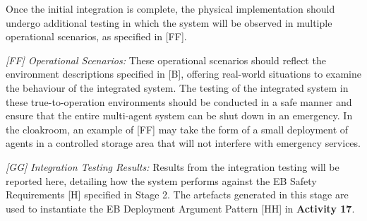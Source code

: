 \documentclass[runningheads]{llncs}
\begin{document}
Once the initial integration is complete, the physical implementation should undergo additional testing in which the system will be observed in multiple operational scenarios, as specified in [FF].

\emph{[FF] Operational Scenarios:} These operational scenarios should reflect the environment descriptions specified in [B], offering real-world situations to examine the behaviour of the integrated system. 
The testing of the integrated system in these true-to-operation environments should be conducted in a safe manner and ensure that the entire multi-agent system can be shut down in an emergency. 
In the cloakroom, an example of [FF] may take the form of a small deployment of agents in a controlled storage area that will not interfere with emergency services.
%

\emph{[GG] Integration Testing Results:} Results from the integration testing will be reported here, detailing how the system performs against the EB Safety Requirements [H] specified in Stage 2. 
The artefacts generated in this stage are used to instantiate the EB Deployment Argument Pattern [HH] in \textbf{Activity 17}.

\end{document}
